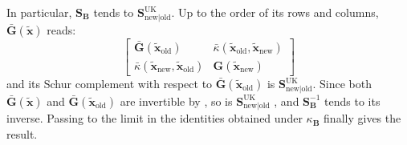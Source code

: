 In particular, $\mathbf{S}_{\mathbf{B}}$ tends to $\mathbf{S}_{\mathrm{new}|\mathrm{old}}^{\mathrm{UK}}$. Up to the order of its rows and columns, $\bar{\mathbf{G}}(\tilde{\mathbf{x}})$ reads:
\begin{equation}
	\begin{bmatrix}\bar{\mathbf{G}}(\tilde{\mathbf{x}}_{\mathrm{old}})&\bar{\kappa}(\tilde{\mathbf{x}}_{\mathrm{old}},\tilde{\mathbf{x}}_{\mathrm{new}})\\\bar{\kappa}(\tilde{\mathbf{x}}_{\mathrm{new}},\tilde{\mathbf{x}}_{\mathrm{old}})&\mathbf{G}(\tilde{\mathbf{x}}_{\mathrm{new}})\end{bmatrix}
\end{equation}
and its Schur complement with respect to $\bar{\mathbf{G}}(\tilde{\mathbf{x}}_{\mathrm{old}})$ is $\mathbf{S}_{\mathrm{new}|\mathrm{old}}^{\mathrm{UK}}$. Since both $\bar{\mathbf{G}}(\tilde{\mathbf{x}})$ and $\bar{\mathbf{G}}(\tilde{\mathbf{x}}_{\mathrm{old}})$ are invertible by , so is $\mathbf{S}_{\mathrm{new}|\mathrm{old}}^{\mathrm{UK}}$ \cite{bib:Schur-complement}, and $\mathbf{S}_{\mathbf{B}}^{-1}$ tends to its inverse. Passing to the limit in the identities obtained under $\kappa_{\mathbf{B}}$ finally gives the result.
